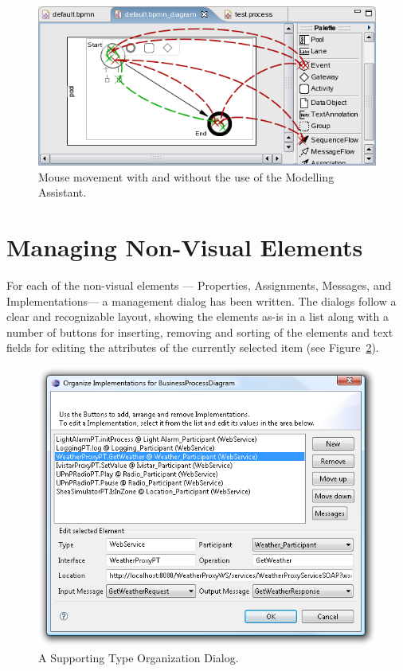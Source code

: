 \begin{figure}[ht]
	\centering
	\includegraphics[width=.5\textwidth]{figures/features/modellingAssistant.png}
	\caption{Mouse movement with and without the use of the Modelling Assistant.}
	\label{fig:modAss}
\end{figure}



\section{Managing Non-Visual Elements}
\label{sec:user_features_nonvis}

For each of the non-visual elements --- Properties, Assignments, Messages, and
Implementations--- a management dialog has been written.  The dialogs follow a
clear and recognizable layout, showing the elements as-is in a list along with a
number of buttons for inserting, removing and sorting of the elements and text
fields for editing the attributes of the currently selected item (see
Figure~\ref{fig:dialog}).

\begin{figure}[ht]
	\centering
	\includegraphics[width=.5\textwidth]{figures/features/dialog.png}
	\caption{A Supporting Type Organization Dialog.}
	\label{fig:dialog}
\end{figure}

